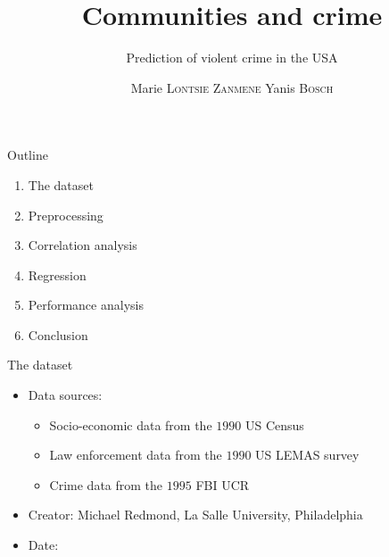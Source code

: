 \documentclass{beamer}
\begin{document}
	\begin{frame}
		\title{Communities and crime}
		\subtitle{Prediction of violent crime in the USA}
		\author{Marie \textsc{Lontsie Zanmene} Yanis \textsc{Bosch}}
		\maketitle
	\end{frame}

	\begin{frame}{Outline}
		\begin{enumerate}
			\item The dataset
			\item Preprocessing
			\item Correlation analysis
			\item Regression
			\item Performance analysis
			\item Conclusion
		\end{enumerate}
	\end{frame}

	\begin{frame}{The dataset}
		\begin{itemize}
			\item Data sources:
				\begin{itemize}
					\item Socio-economic data from the $1990$ US Census
					\item Law enforcement data from the $1990$ US LEMAS survey
					\item Crime data from the $1995$ FBI UCR
				\end{itemize}
			\item Creator: Michael Redmond, La Salle University, Philadelphia
			\item Date: \formatdate{13}{7}{2009}
		\end{itemize}
	\end{frame}
\end{document}
